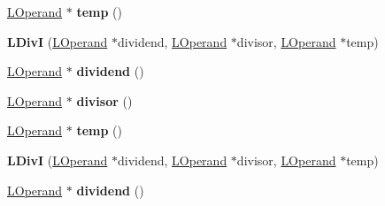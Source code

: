 \begin{DoxyCompactItemize}
\item 
\hyperlink{classv8_1_1internal_1_1_l_operand}{L\+Operand} $\ast$ {\bfseries temp} ()\hypertarget{classv8_1_1internal_1_1_l_div_i_ab28d8d7ab78227bb8dcc89a205a7c7be}{}\label{classv8_1_1internal_1_1_l_div_i_ab28d8d7ab78227bb8dcc89a205a7c7be}

\item 
{\bfseries L\+DivI} (\hyperlink{classv8_1_1internal_1_1_l_operand}{L\+Operand} $\ast$dividend, \hyperlink{classv8_1_1internal_1_1_l_operand}{L\+Operand} $\ast$divisor, \hyperlink{classv8_1_1internal_1_1_l_operand}{L\+Operand} $\ast$temp)\hypertarget{classv8_1_1internal_1_1_l_div_i_a2c447a721208972b1aa2bbbdf5ae58c9}{}\label{classv8_1_1internal_1_1_l_div_i_a2c447a721208972b1aa2bbbdf5ae58c9}

\item 
\hyperlink{classv8_1_1internal_1_1_l_operand}{L\+Operand} $\ast$ {\bfseries dividend} ()\hypertarget{classv8_1_1internal_1_1_l_div_i_a324dcd2105a5772942591b32a93edf8c}{}\label{classv8_1_1internal_1_1_l_div_i_a324dcd2105a5772942591b32a93edf8c}

\item 
\hyperlink{classv8_1_1internal_1_1_l_operand}{L\+Operand} $\ast$ {\bfseries divisor} ()\hypertarget{classv8_1_1internal_1_1_l_div_i_a5ceb6d1f5a2f1f0c998966e525a2cb3c}{}\label{classv8_1_1internal_1_1_l_div_i_a5ceb6d1f5a2f1f0c998966e525a2cb3c}

\item 
\hyperlink{classv8_1_1internal_1_1_l_operand}{L\+Operand} $\ast$ {\bfseries temp} ()\hypertarget{classv8_1_1internal_1_1_l_div_i_ab28d8d7ab78227bb8dcc89a205a7c7be}{}\label{classv8_1_1internal_1_1_l_div_i_ab28d8d7ab78227bb8dcc89a205a7c7be}

\item 
{\bfseries L\+DivI} (\hyperlink{classv8_1_1internal_1_1_l_operand}{L\+Operand} $\ast$dividend, \hyperlink{classv8_1_1internal_1_1_l_operand}{L\+Operand} $\ast$divisor, \hyperlink{classv8_1_1internal_1_1_l_operand}{L\+Operand} $\ast$temp)\hypertarget{classv8_1_1internal_1_1_l_div_i_a2c447a721208972b1aa2bbbdf5ae58c9}{}\label{classv8_1_1internal_1_1_l_div_i_a2c447a721208972b1aa2bbbdf5ae58c9}

\item 
\hyperlink{classv8_1_1internal_1_1_l_operand}{L\+Operand} $\ast$ {\bfseries dividend} ()\hypertarget{classv8_1_1internal_1_1_l_div_i_a324dcd2105a5772942591b32a93edf8c}{}\label{classv8_1_1internal_1_1_l_div_i_a324dcd2105a5772942591b32a93edf8c}


\end{DoxyCompactItemize}
